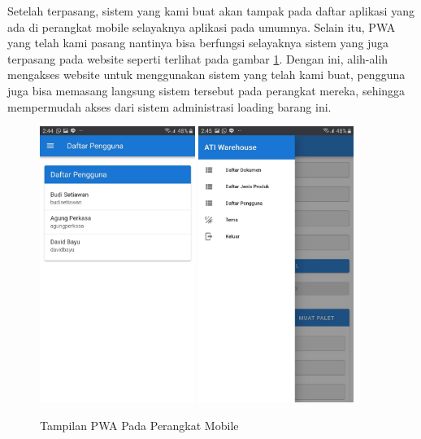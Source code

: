 Setelah terpasang, sistem yang kami buat akan tampak pada daftar aplikasi yang ada di perangkat mobile selayaknya aplikasi pada umumnya.
Selain itu, PWA yang telah kami pasang nantinya bisa berfungsi selayaknya sistem yang juga terpasang pada website seperti terlihat pada gambar \ref{fig:tampilanPwa}.
Dengan ini, alih-alih mengakses website untuk menggunakan sistem yang telah kami buat,  pengguna juga bisa memasang langsung sistem tersebut pada perangkat mereka, sehingga mempermudah akses dari sistem administrasi loading barang ini.
\vspace{0.5ex}

\begin{figure} [ht!] \centering
  \includegraphics[width=0.45\textwidth]{gambar/tampilan-pwa-1.jpg}
  \includegraphics[width=0.45\textwidth]{gambar/tampilan-pwa-2.jpg}
  \caption{Tampilan PWA Pada Perangkat Mobile}
  \label{fig:tampilanPwa}
\end{figure}

